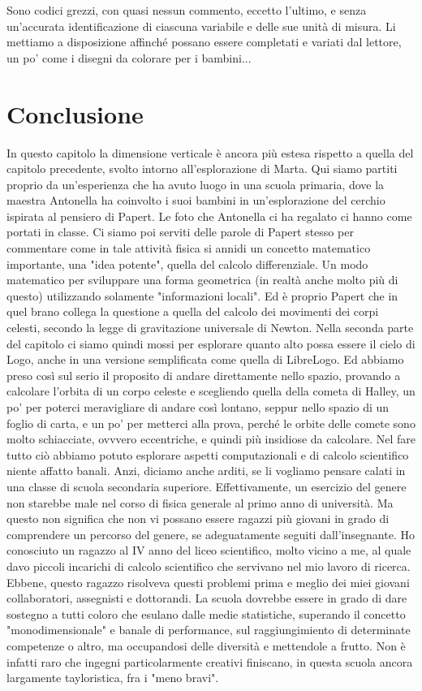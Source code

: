 \vskip 1cm

Sono codici grezzi, con quasi nessun commento, eccetto l'ultimo, e senza un'accurata identificazione di ciascuna variabile e delle sue unità di misura. Li mettiamo a disposizione affinché possano essere completati e variati dal lettore, un po' come i disegni da colorare per i bambini...

\section{Conclusione}

In questo capitolo la dimensione verticale è ancora più estesa rispetto a quella del capitolo precedente, svolto intorno all'esplorazione di Marta. Qui siamo partiti proprio da un'esperienza che ha avuto luogo in una scuola primaria, dove la maestra Antonella ha coinvolto i suoi bambini in un'esplorazione del cerchio ispirata al pensiero di Papert. Le foto che Antonella ci ha regalato ci hanno come portati in classe. Ci siamo poi serviti delle parole di Papert stesso per commentare come in tale attività fisica si annidi un concetto matematico importante, una "idea potente", quella del calcolo differenziale. Un modo matematico per sviluppare una forma geometrica (in realtà anche molto più di questo) utilizzando solamente "informazioni locali". Ed è proprio Papert che in quel brano collega la questione a quella del calcolo dei movimenti dei corpi celesti, secondo la legge di gravitazione universale di Newton. Nella seconda parte del capitolo ci siamo quindi mossi per esplorare quanto alto possa essere il cielo di Logo, anche in una versione semplificata come quella di LibreLogo. Ed abbiamo preso così sul serio il proposito di andare direttamente nello spazio, provando a calcolare l'orbita di un corpo celeste e scegliendo quella della cometa di Halley, un po' per poterci meravigliare di andare così lontano, seppur nello spazio di un foglio di carta, e un po' per metterci alla prova, perché le orbite delle comete sono molto schiacciate, ovvvero eccentriche, e quindi più insidiose da calcolare. Nel fare tutto ciò abbiamo potuto esplorare aspetti computazionali e di calcolo scientifico niente affatto banali. Anzi, diciamo anche arditi, se li vogliamo pensare calati in una classe di scuola secondaria superiore. Effettivamente, un esercizio del genere non starebbe male nel corso di fisica generale al primo anno di università. Ma questo non significa che non vi possano essere ragazzi più giovani in grado di comprendere un percorso del genere, se adeguatamente seguiti dall'insegnante. Ho conosciuto un ragazzo al IV anno del liceo scientifico, molto vicino a me, al quale davo piccoli incarichi di calcolo scientifico che servivano nel mio lavoro di ricerca. Ebbene, questo ragazzo risolveva questi problemi prima e meglio dei miei giovani collaboratori, assegnisti e dottorandi. La scuola dovrebbe essere in grado di dare sostegno a tutti coloro che esulano dalle medie statistiche, superando il concetto "monodimensionale" e banale di performance, sul raggiungimiento di determinate competenze o altro, ma occupandosi delle diversità e mettendole a frutto. Non è infatti raro che ingegni particolarmente creativi finiscano, in questa scuola ancora largamente tayloristica, fra i "meno bravi".

